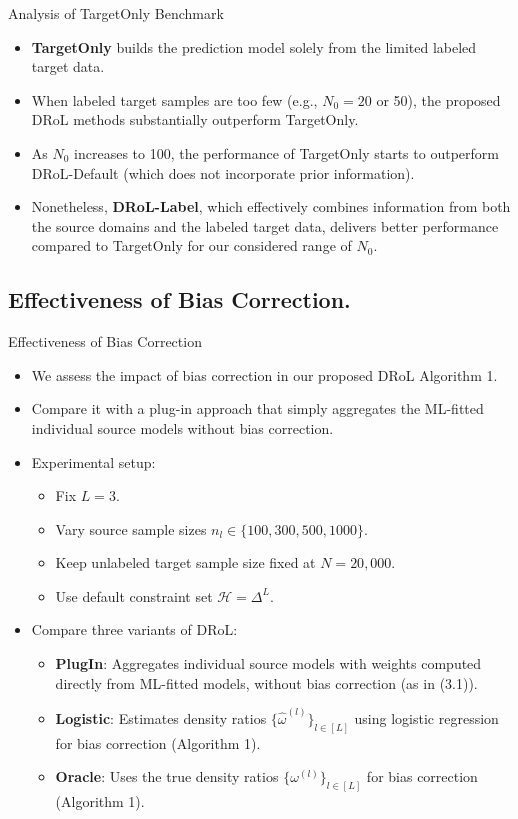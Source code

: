 \documentclass{beamer}
\begin{document}
\begin{frame}{Analysis of TargetOnly Benchmark}
    \begin{itemize}
        \item \textbf{TargetOnly} builds the prediction model solely from the limited labeled target data.
        \item When labeled target samples are too few (e.g., $N_0 = 20$ or 50), the proposed DRoL methods substantially outperform TargetOnly.
        \item As $N_0$ increases to 100, the performance of TargetOnly starts to outperform DRoL-Default (which does not incorporate prior information).
        \item Nonetheless, \textbf{DRoL-Label}, which effectively combines information from both the source domains and the labeled target data, delivers better performance compared to TargetOnly for our considered range of $N_0$.
    \end{itemize}
\end{frame}

\subsection{Effectiveness of Bias Correction.}

\begin{frame}{Effectiveness of Bias Correction}
    \begin{itemize}
        \item We assess the impact of bias correction in our proposed DRoL Algorithm 1.
        \item Compare it with a plug-in approach that simply aggregates the ML-fitted individual source models without bias correction.
        \item Experimental setup:
        \begin{itemize}
            \item Fix $L = 3$.
            \item Vary source sample sizes $n_l \in \{100, 300, 500, 1000\}$.
            \item Keep unlabeled target sample size fixed at $N = 20,000$.
            \item Use default constraint set $\mathcal{H} = \Delta^{L}$.
        \end{itemize}
        \item Compare three variants of DRoL:
        \begin{itemize}
            \item \textbf{PlugIn}: Aggregates individual source models with weights computed directly from ML-fitted models, without bias correction (as in (3.1)).
            \item \textbf{Logistic}: Estimates density ratios $\{\widehat{\omega}^{(l)}\}_{l \in [L]}$ using logistic regression for bias correction (Algorithm 1).
            \item \textbf{Oracle}: Uses the true density ratios $\{\omega^{(l)}\}_{l \in [L]}$ for bias correction (Algorithm 1).
        \end{itemize}
    \end{itemize}
\end{frame}
\end{document}
